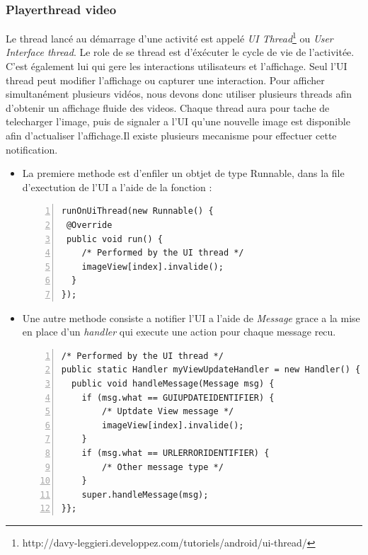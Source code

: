 \subsubsection{Playerthread video}
Le thread lancé au démarrage d'une activité est appelé \textit{UI Thread}\footnote{\label{UIThread}
http://davy-leggieri.developpez.com/tutoriels/android/ui-thread/} ou
\textit{User Interface thread}. Le role de se thread est d'éxécuter le cycle de
vie de l'activitée. C'est également lui qui gere les interactions
utilisateurs et l'affichage. Seul l'UI thread peut modifier l'affichage
ou capturer une interaction.\newline 
\indent Pour afficher simultanément plusieurs vidéos, nous devons donc utiliser
plusieurs threads afin d'obtenir un affichage fluide des videos.\newline
Chaque thread aura pour tache de telecharger l'image, puis de signaler a l'UI
qu'une nouvelle image est disponible afin d'actualiser
l'affichage.\newline\newline\indent Il existe plusieurs mecanisme pour effectuer
cette notification.\newline
\begin{itemize}
  \item La premiere methode est d'enfiler un obtjet de type
  Runnable, dans la file d'exectution de l'UI a l'aide de la
  fonction : \newline
  \begin{lstlisting}[caption={Example of use runOnUiThread}, 
  framexleftmargin=7mm, numbers=left]
 runOnUiThread(new Runnable() {
 @Override
 public void run() {
	/* Performed by the UI thread */
	imageView[index].invalide();
  }
});  
  \end{lstlisting}
\item Une autre methode consiste a notifier l'UI a l'aide de
\textit{Message} grace a la mise en place d'un \textit{handler} qui
execute une action pour chaque message recu.\newline
\begin{lstlisting}[caption={Example of message handler}, framexleftmargin=7mm, numbers=left] 
/* Performed by the UI thread */
public static Handler myViewUpdateHandler = new Handler() {
  public void handleMessage(Message msg) {
	if (msg.what == GUIUPDATEIDENTIFIER) {
		/* Uptdate View message */
		imageView[index].invalide();
	}
	if (msg.what == URLERRORIDENTIFIER) {
		/* Other message type */
	}
	super.handleMessage(msg);
}};    
\end{lstlisting}    
\end{itemize}
